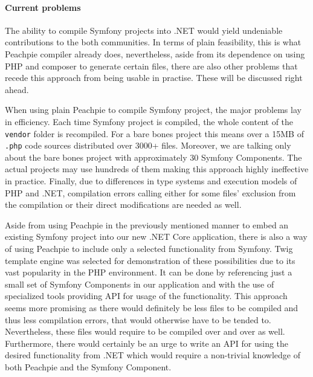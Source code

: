\paragraph{Current problems} The ability to compile Symfony projects into .NET would yield undeniable contributions to the both communities. In terms of plain feasibility, this is what Peachpie compiler already does, nevertheless, aside from its dependence on using PHP and composer to generate certain files, there are also other problems that recede this approach from being usable in practise. These will be discussed right ahead.

When using plain Peachpie to compile Symfony project, the major problems lay in efficiency. Each time Symfony project is compiled, the whole content of the \texttt{vendor} folder is recompiled. For a bare bones project this means over a 15MB of \texttt{.php} code sources distributed over 3000+ files. Moreover, we are talking only about the bare bones project with approximately 30 Symfony Components. The actual projects may use hundreds of them making this approach highly ineffective in practice. Finally, due to differences in type systems and execution models of PHP and .NET, compilation errors calling either for some files' exclusion from the compilation or their direct modifications are needed as well.

Aside from using Peachpie in the previously mentioned manner to embed an existing Symfony project into our new .NET Core application, there is also a way of using Peachpie to include only a selected functionality from Symfony. Twig template engine was selected for demonstration of these possibilities due to its vast popularity in the PHP environment. It can be done by referencing just a small set of Symfony Components in our application and with the use of specialized tools providing API for usage of the functionality. This approach seems more promising as there would definitely be less files to be compiled and thus less compilation errors, that would otherwise have to be tended to. Nevertheless, these files would require to be compiled over and over as well. Furthermore, there would certainly be an urge to write an API for using the desired functionality from .NET which would require a non-trivial knowledge of both Peachpie and the Symfony Component.


